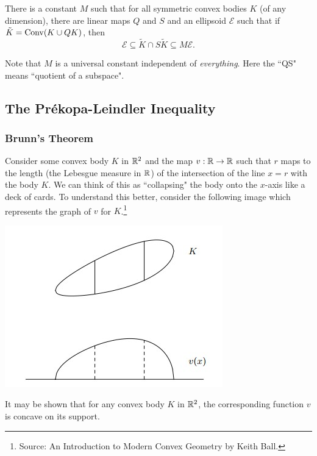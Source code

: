 \begin{ftheo}[QS-Theorem]
There is a constant $M$ such that for all symmetric convex bodies $K$ (of any dimension), there are linear maps $Q$ and $S$ and an ellipsoid $\mathcal{E}$ such that if $\tilde K = \operatorname{Conv}(K\cup Q K)$, then
\[ \mathcal{E} \subseteq \tilde K \cap S \tilde K \subseteq M\mathcal{E}. \]
\end{ftheo}

Note that $M$ is a universal constant independent of \textit{everything}. Here the ``QS" means ``quotient of a subspace".

\clearpage
\subsection{The Pr\'{e}kopa-Leindler Inequality}

\subsubsection{Brunn's Theorem}

Consider some convex body $K$ in $\mathbb{R}^2$ and the map $v:\mathbb{R}\to\mathbb{R}$ such that $r$ maps to the length (the Lebesgue measure in $\mathbb{R}$) of the intersection of the line $x=r$ with the body $K$. We can think of this as ``collapsing" the body onto the $x$-axis like a deck of cards. To understand this better, consider the following image which represents the graph of $v$ for $K$.\footnote{Source: An Introduction to Modern Convex Geometry by Keith Ball.}

\begin{center}
    \includegraphics{brunn-shakedown.jpg}
\end{center}

It may be shown that for any convex body $K$ in $\mathbb{R}^2$, the corresponding function $v$ is concave on its support.\\

